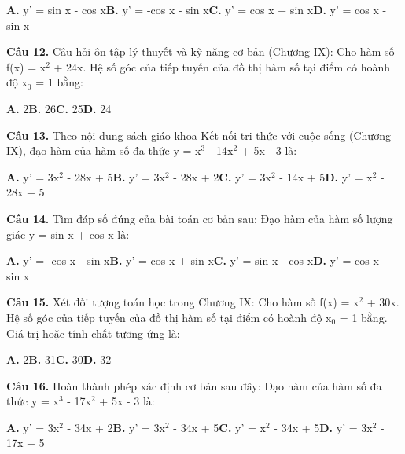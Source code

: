 \documentclass[11pt,a4paper]{article}
\begin{document}
\hspace*{1.5em}\textbf{A.} y' = sin x - cos x\quad\quad \textbf{B.} y' = -cos x - sin x\quad\quad \textbf{C.} y' = cos x + sin x\quad\quad \textbf{D.} y' = cos x - sin x\par\vspace{2pt}
\textbf{\color{primary} Câu 12.} Câu hỏi ôn tập lý thuyết và kỹ năng cơ bản (Chương IX): Cho hàm số f(x) = x$^2$ + 24x. Hệ số góc của tiếp tuyến của đồ thị hàm số tại điểm có hoành độ x$_0$ = 1 bằng:\par
\hspace*{1.5em}\textbf{A.} 2\quad\quad \textbf{B.} 26\quad\quad \textbf{C.} 25\quad\quad \textbf{D.} 24\par\vspace{2pt}
\textbf{\color{primary} Câu 13.} Theo nội dung sách giáo khoa Kết nối tri thức với cuộc sống (Chương IX), đạo hàm của hàm số đa thức y = x$^3$ - 14x$^2$ + 5x - 3 là:\par
\hspace*{1.5em}\textbf{A.} y' = 3x$^2$ - 28x + 5\quad\quad \textbf{B.} y' = 3x$^2$ - 28x + 2\quad\quad \textbf{C.} y' = 3x$^2$ - 14x + 5\quad\quad \textbf{D.} y' = x$^2$ - 28x + 5\par\vspace{2pt}
\textbf{\color{primary} Câu 14.} Tìm đáp số đúng của bài toán cơ bản sau: Đạo hàm của hàm số lượng giác y = sin x + cos x là:\par
\hspace*{1.5em}\textbf{A.} y' = -cos x - sin x\quad\quad \textbf{B.} y' = cos x + sin x\quad\quad \textbf{C.} y' = sin x - cos x\quad\quad \textbf{D.} y' = cos x - sin x\par\vspace{2pt}
\textbf{\color{primary} Câu 15.} Xét đối tượng toán học trong Chương IX: Cho hàm số f(x) = x$^2$ + 30x. Hệ số góc của tiếp tuyến của đồ thị hàm số tại điểm có hoành độ x$_0$ = 1 bằng. Giá trị hoặc tính chất tương ứng là:\par
\hspace*{1.5em}\textbf{A.} 2\quad\quad \textbf{B.} 31\quad\quad \textbf{C.} 30\quad\quad \textbf{D.} 32\par\vspace{2pt}
\textbf{\color{primary} Câu 16.} Hoàn thành phép xác định cơ bản sau đây: Đạo hàm của hàm số đa thức y = x$^3$ - 17x$^2$ + 5x - 3 là:\par
\hspace*{1.5em}\textbf{A.} y' = 3x$^2$ - 34x + 2\quad\quad \textbf{B.} y' = 3x$^2$ - 34x + 5\quad\quad \textbf{C.} y' = x$^2$ - 34x + 5\quad\quad \textbf{D.} y' = 3x$^2$ - 17x + 5\par\vspace{2pt}
\end{document}

